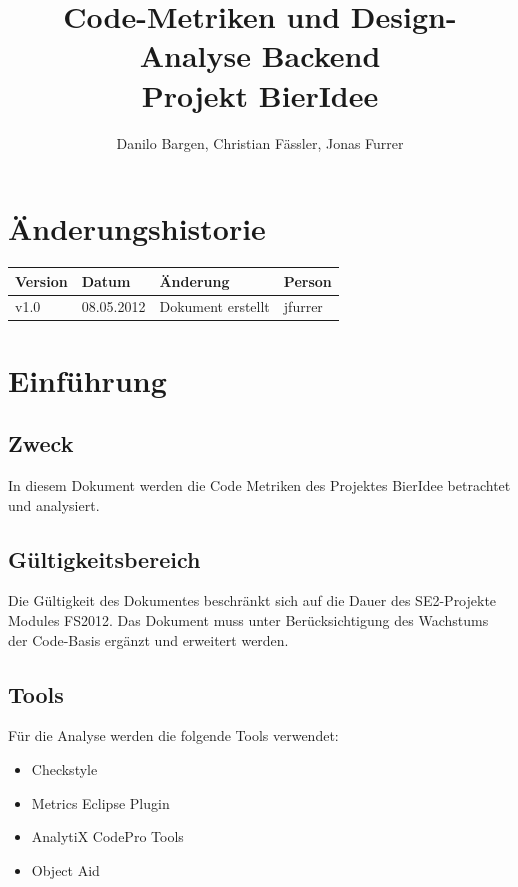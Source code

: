 \documentclass[10pt,a4paper]{scrartcl}
\author{Danilo Bargen, Christian Fässler, Jonas Furrer}
\title{Code-Metriken und Design-Analyse Backend\\ Projekt BierIdee}
\begin{document}
\begin{titlepage}
	\maketitle
	\vspace{120mm}
	\thispagestyle{empty} %
\end{titlepage}

\tableofcontents
\newpage

\section*{Änderungshistorie}
\begin{tabular}{p{}p{}p{}p{}}
\toprule
\textbf{Version} & \textbf{Datum} & \textbf{Änderung} & \textbf{Person} \\  
\midrule
v1.0 & 08.05.2012 & Dokument erstellt & jfurrer \\  
\bottomrule
\end{tabular} 
\newpage

\section{Einführung}

\subsection{Zweck}
In diesem Dokument werden die Code Metriken des Projektes BierIdee betrachtet und analysiert.

\subsection{Gültigkeitsbereich}
Die Gültigkeit des Dokumentes beschränkt sich auf die Dauer des SE2-Projekte Modules FS2012. Das
Dokument muss unter Berücksichtigung des Wachstums der Code-Basis ergänzt und erweitert werden.

\subsection{Tools}
Für die Analyse werden die folgende Tools verwendet:\\
\begin{itemize}
	\item Checkstyle
	\item Metrics Eclipse Plugin
	\item AnalytiX CodePro Tools
	\item Object Aid
\end{itemize}
\end{document}
